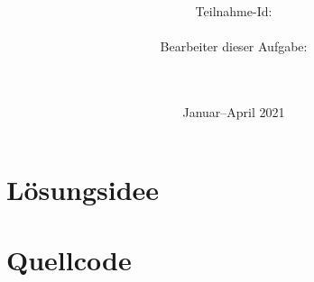 \documentclass[a4paper,10pt,ngerman]{scrartcl}
\title{\textbf{\Huge\Aufgabe}}
\author{\LARGE Teilnahme-Id: \LARGE \TeilnahmeId \\\\
	    \LARGE Bearbeiter dieser Aufgabe: \\ 
	    \LARGE \Namen\\\\}
\date{\LARGE Januar--April 2021}
\begin{document}
\maketitle
\tableofcontents

\newpage
\section{Lösungsidee}














\printbibliography





\newpage
\section{Quellcode}

\end{document}
